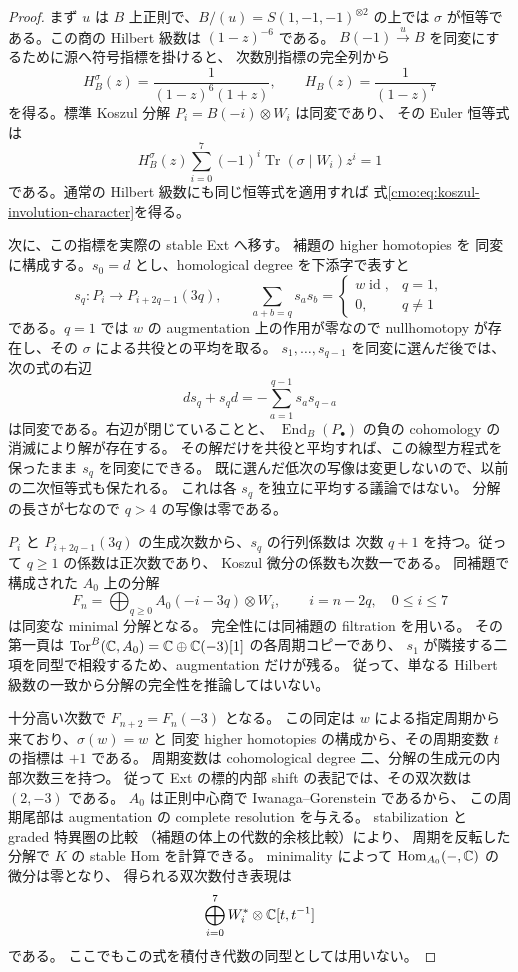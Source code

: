 \begin{proof}
まず $u$ は $B$ 上正則で、$B/(u)=S(1,-1,-1)^{\otimes2}$ の上では
$\sigma$ が恒等である。この商の Hilbert 級数は $(1-z)^{-6}$ である。
$B(-1)\xrightarrow{u}B$ を同変にするために源へ符号指標を掛けると、
次数別指標の完全列から
\[
 H_B^\sigma(z)=\frac1{(1-z)^6(1+z)},\qquad H_B(z)=\frac1{(1-z)^7}
\]
を得る。標準 Koszul 分解 $P_i=B(-i)\otimes W_i$ は同変であり、
その Euler 恒等式は
\[
 H_B^\sigma(z)\sum_{i=0}^7(-1)^i\operatorname{Tr}(\sigma\mid W_i)z^i=1
\]
である。通常の Hilbert 級数にも同じ恒等式を適用すれば
式\eqref{cmo:eq:koszul-involution-character}を得る。

次に、この指標を実際の stable Ext へ移す。
補題の higher homotopies を
同変に構成する。$s_0=d$ とし、homological degree を下添字で表すと
\[
 s_q:P_i\longrightarrow P_{i+2q-1}(3q),\qquad
 \sum_{a+b=q}s_as_b=
 \begin{cases}
  w\operatorname{id},&q=1,\\
  0,&q\ne1
 \end{cases}
\]
である。$q=1$ では $w$ の augmentation 上の作用が零なので
nullhomotopy が存在し、その $\sigma$ による共役との平均を取る。
$s_1,\ldots,s_{q-1}$ を同変に選んだ後では、次の式の右辺
\[
 d s_q+s_qd=-\sum_{a=1}^{q-1}s_as_{q-a}
\]
は同変である。右辺が閉じていることと、
$\operatorname{End}_B(P_\bullet)$ の負の cohomology の消滅により解が存在する。
その解だけを共役と平均すれば、この線型方程式を保ったまま
$s_q$ を同変にできる。
既に選んだ低次の写像は変更しないので、以前の二次恒等式も保たれる。
これは各 $s_q$ を独立に平均する議論ではない。
分解の長さが七なので $q>4$ の写像は零である。

$P_i$ と $P_{i+2q-1}(3q)$ の生成次数から、$s_q$ の行列係数は
次数 $q+1$ を持つ。従って $q\ge1$ の係数は正次数であり、
Koszul 微分の係数も次数一である。
同補題で構成された $A_0$ 上の分解
\begin{equation}\label{cmo:eq:equivariant-minimal-shamash}
 F_n=\bigoplus_{q\ge0}
       A_0(-i-3q)\otimes W_i,\qquad i=n-2q,\quad 0\le i\le7
\end{equation}
は同変な minimal 分解となる。
完全性には同補題の filtration を用いる。
その第一頁は $\operatorname{Tor}^B(\mathbb C,A_0)
=\mathbb C\oplus\mathbb C(-3)[1]$ の各周期コピーであり、
$s_1$ が隣接する二項を同型で相殺するため、augmentation だけが残る。
従って、単なる Hilbert 級数の一致から分解の完全性を推論してはいない。

十分高い次数で $F_{n+2}=F_n(-3)$ となる。
この同定は $w$ による指定周期から来ており、$\sigma(w)=w$ と
同変 higher homotopies の構成から、その周期変数 $t$ の指標は $+1$ である。
周期変数は cohomological degree 二、分解の生成元の内部次数三を持つ。
従って Ext の標的内部 shift の表記では、その双次数は $(2,-3)$ である。
$A_0$ は正則中心商で Iwanaga--Gorenstein であるから、
この周期尾部は augmentation の complete resolution を与える。
stabilization と graded 特異圏の比較
（補題の体上の代数的余核比較）により、
周期を反転した分解で $K$ の stable Hom を計算できる。
minimality によって $\operatorname{Hom}_{A_0}(-,\mathbb C)$ の微分は零となり、
得られる双次数付き表現は
\[
 \bigoplus_{i=0}^7 W_i^*\otimes\mathbb C[t,t^{-1}]
\]
である。
ここでもこの式を積付き代数の同型としては用いない。


\end{proof}
